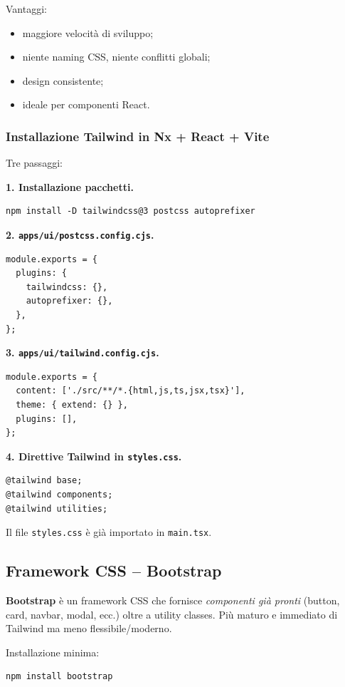 \documentclass[11pt,a4paper]{article}
\begin{document}
Vantaggi:
\begin{itemize}[leftmargin=*]
    \item maggiore velocit\`a di sviluppo;
    \item niente naming CSS, niente conflitti globali;
    \item design consistente;
    \item ideale per componenti React.
\end{itemize}

\subsubsection{Installazione Tailwind in Nx + React + Vite}

Tre passaggi:

\textbf{1. Installazione pacchetti.}
\begin{lstlisting}
npm install -D tailwindcss@3 postcss autoprefixer
\end{lstlisting}

\textbf{2. \texttt{apps/ui/postcss.config.cjs}.}
\begin{lstlisting}[language=tsx]
module.exports = {
  plugins: {
    tailwindcss: {},
    autoprefixer: {},
  },
};
\end{lstlisting}

\textbf{3. \texttt{apps/ui/tailwind.config.cjs}.}
\begin{lstlisting}[language=tsx]
module.exports = {
  content: ['./src/**/*.{html,js,ts,jsx,tsx}'],
  theme: { extend: {} },
  plugins: [],
};
\end{lstlisting}

\textbf{4. Direttive Tailwind in \texttt{styles.css}.}
\begin{lstlisting}
@tailwind base;
@tailwind components;
@tailwind utilities;
\end{lstlisting}

Il file \texttt{styles.css} \`e gi\`a importato in \texttt{main.tsx}.

\subsection{Framework CSS -- Bootstrap}

\textbf{Bootstrap} \`e un framework CSS che fornisce \emph{componenti gi\`a pronti} (button, card, navbar, modal, ecc.) oltre a utility classes. Pi\`u maturo e immediato di Tailwind ma meno flessibile/moderno.

Installazione minima:
\begin{lstlisting}
npm install bootstrap
\end{lstlisting}
\end{document}
